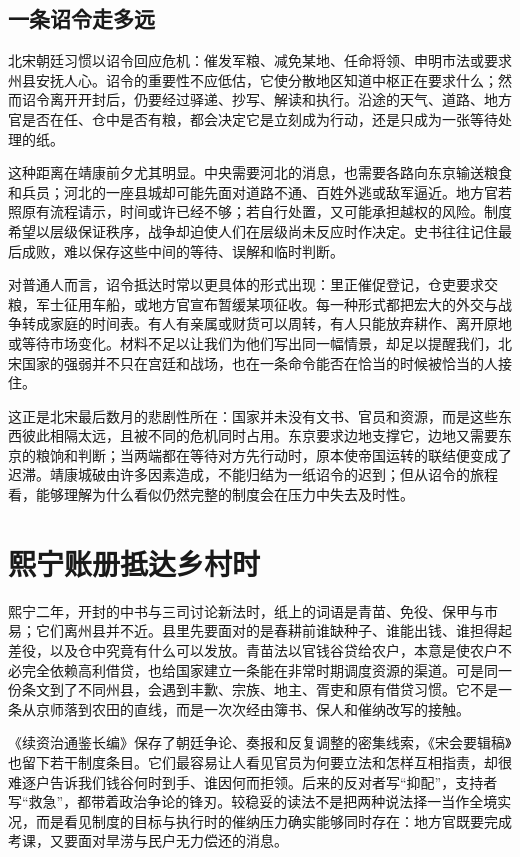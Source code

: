 \subsection{一条诏令走多远}

北宋朝廷习惯以诏令回应危机：催发军粮、减免某地、任命将领、申明市法或要求州县安抚人心。诏令的重要性不应低估，它使分散地区知道中枢正在要求什么；然而诏令离开开封后，仍要经过驿递、抄写、解读和执行。沿途的天气、道路、地方官是否在任、仓中是否有粮，都会决定它是立刻成为行动，还是只成为一张等待处理的纸。

这种距离在靖康前夕尤其明显。中央需要河北的消息，也需要各路向东京输送粮食和兵员；河北的一座县城却可能先面对道路不通、百姓外逃或敌军逼近。地方官若照原有流程请示，时间或许已经不够；若自行处置，又可能承担越权的风险。制度希望以层级保证秩序，战争却迫使人们在层级尚未反应时作决定。史书往往记住最后成败，难以保存这些中间的等待、误解和临时判断。

对普通人而言，诏令抵达时常以更具体的形式出现：里正催促登记，仓吏要求交粮，军士征用车船，或地方官宣布暂缓某项征收。每一种形式都把宏大的外交与战争转成家庭的时间表。有人有亲属或财货可以周转，有人只能放弃耕作、离开原地或等待市场变化。材料不足以让我们为他们写出同一幅情景，却足以提醒我们，北宋国家的强弱并不只在宫廷和战场，也在一条命令能否在恰当的时候被恰当的人接住。

这正是北宋最后数月的悲剧性所在：国家并未没有文书、官员和资源，而是这些东西彼此相隔太远，且被不同的危机同时占用。东京要求边地支撑它，边地又需要东京的粮饷和判断；当两端都在等待对方先行动时，原本使帝国运转的联结便变成了迟滞。靖康城破由许多因素造成，不能归结为一纸诏令的迟到；但从诏令的旅程看，能够理解为什么看似仍然完整的制度会在压力中失去及时性。

\section{熙宁账册抵达乡村时}

熙宁二年，开封的中书与三司讨论新法时，纸上的词语是青苗、免役、保甲与市易；它们离州县并不近。县里先要面对的是春耕前谁缺种子、谁能出钱、谁担得起差役，以及仓中究竟有什么可以发放。青苗法以官钱谷贷给农户，本意是使农户不必完全依赖高利借贷，也给国家建立一条能在非常时期调度资源的渠道。可是同一份条文到了不同州县，会遇到丰歉、宗族、地主、胥吏和原有借贷习惯。它不是一条从京师落到农田的直线，而是一次次经由簿书、保人和催纳改写的接触。

《续资治通鉴长编》保存了朝廷争论、奏报和反复调整的密集线索，《宋会要辑稿》也留下若干制度条目。它们最容易让人看见官员为何要立法和怎样互相指责，却很难逐户告诉我们钱谷何时到手、谁因何而拒领。后来的反对者写“抑配”，支持者写“救急”，都带着政治争论的锋刃。较稳妥的读法不是把两种说法择一当作全境实况，而是看见制度的目标与执行时的催纳压力确实能够同时存在：地方官既要完成考课，又要面对旱涝与民户无力偿还的消息。

